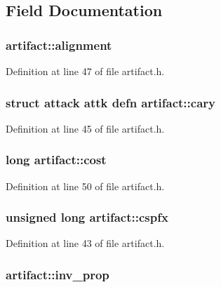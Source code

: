 \subsection{Field Documentation}
\hypertarget{structartifact_adf0fe93392024db3d65676e939087540}{
\subsubsection[{alignment}]{ artifact\+::alignment}}\label{structartifact_adf0fe93392024db3d65676e939087540}


Definition at line 47 of file artifact.\+h.

\hypertarget{structartifact_a4dc2727628799c80e2597bd4101e0fc9}{
\subsubsection[{cary}]{\setlength{\rightskip}{0pt plus 5cm}struct {\bf attack} attk defn artifact\+::cary}}\label{structartifact_a4dc2727628799c80e2597bd4101e0fc9}


Definition at line 45 of file artifact.\+h.

\hypertarget{structartifact_a655f854058be152ec4a6b0c5d7f40e30}{
\subsubsection[{cost}]{\setlength{\rightskip}{0pt plus 5cm}long artifact\+::cost}}\label{structartifact_a655f854058be152ec4a6b0c5d7f40e30}


Definition at line 50 of file artifact.\+h.

\hypertarget{structartifact_a2d33b1358ba1fc467f783672789a6ea1}{
\subsubsection[{cspfx}]{\setlength{\rightskip}{0pt plus 5cm}unsigned long artifact\+::cspfx}}\label{structartifact_a2d33b1358ba1fc467f783672789a6ea1}


Definition at line 43 of file artifact.\+h.

\hypertarget{structartifact_a2e7994f81541381f55d68f9427b2d771}{
\subsubsection[{inv\+\_\+prop}]{ artifact\+::inv\+\_\+prop}}\label{structartifact_a2e7994f81541381f55d68f9427b2d771}


